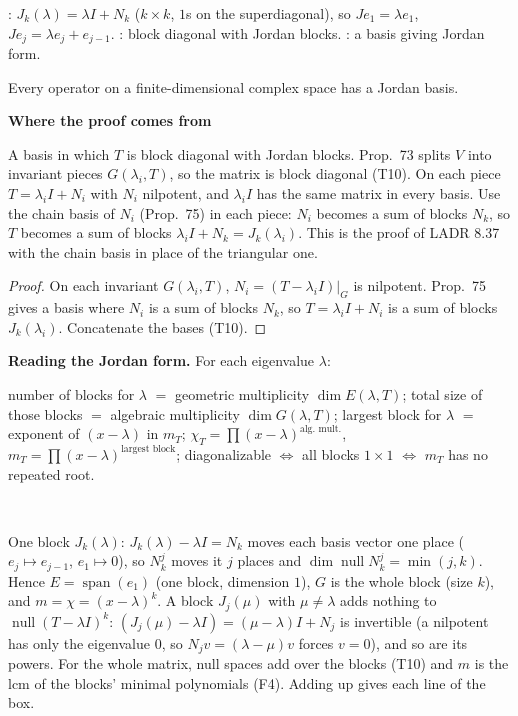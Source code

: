 \documentclass[10pt]{scrartcl}
\DeclareMathOperator{\nul}{null}
\DeclareMathOperator{\spn}{span}
\newcommand{\why}[1]{\par\vspace{2pt}{\color{OliveGreen!70!black}\textbf{Why.}}\ #1\par}
\newenvironment{motive}{\begin{mdframed}[style=thinkbox]\textbf{\color{OliveGreen!75!black}Where the proof comes from}\begin{description}[leftmargin=0.9em,labelindent=0pt,itemsep=2pt,topsep=2pt,font=\normalfont\bfseries\color{OliveGreen!70!black}]}{\end{description}\end{mdframed}}
\newenvironment{steps}{\begin{enumerate}[label=\arabic*.,leftmargin=1.5em,itemsep=2pt,topsep=2pt]}{\end{enumerate}}
\begin{document}
\begin{definition*}[Def.~40]
  : $J_k(\lambda)=\lambda I+N_k$ ($k\times k$, $1$s on the superdiagonal), so $Je_1=\lambda e_1$, $Je_j=\lambda e_j+e_{j-1}$. : block diagonal with Jordan blocks. : a basis giving Jordan form.
\end{definition*}

\begin{theorem*}
  Every operator on a finite-dimensional complex space has a Jordan basis.
\end{theorem*}
\begin{motive}
  \ii[Want.] A basis in which $T$ is block diagonal with Jordan blocks.
  \ii[Know.] Prop.~73 splits $V$ into invariant pieces $G(\lambda_i,T)$, so the matrix is block diagonal (T10). On each piece $T=\lambda_iI+N_i$ with $N_i$ nilpotent, and $\lambda_iI$ has the same matrix in every basis.
   Use the chain basis of $N_i$ (Prop.~75) in each piece: $N_i$ becomes a sum of blocks $N_k$, so $T$ becomes a sum of blocks $\lambda_iI+N_k=J_k(\lambda_i)$. This is the proof of LADR 8.37 with the chain basis in place of the triangular one.
\end{motive}
\begin{proof}
  On each invariant $G(\lambda_i,T)$, $N_i=(T-\lambda_iI)|_{G}$ is nilpotent. Prop.~75 gives a basis where $N_i$ is a sum of blocks $N_k$, so $T=\lambda_iI+N_i$ is a sum of blocks $J_k(\lambda_i)$. Concatenate the bases (T10).
\end{proof}

\begin{mdframed}[style=mdbluebox]
\textbf{Reading the Jordan form.} For each eigenvalue $\lambda$:
\begin{itemize}
  \ii number of blocks for $\lambda$ $=$ geometric multiplicity $\dim E(\lambda,T)$;
  \ii total size of those blocks $=$ algebraic multiplicity $\dim G(\lambda,T)$;
  \ii largest block for $\lambda$ $=$ exponent of $(x-\lambda)$ in $m_T$;
  \ii $\chi_T=\prod(x-\lambda)^{\text{alg.\ mult.}}$, $m_T=\prod(x-\lambda)^{\text{largest block}}$;
  \ii diagonalizable $\iff$ all blocks $1\times1$ $\iff$ $m_T$ has no repeated root.
\end{itemize}
\why{\begin{steps}
  \ii One block $J_k(\lambda)$: $J_k(\lambda)-\lambda I=N_k$ moves each basis vector one place ($e_j\mapsto e_{j-1}$, $e_1\mapsto0$), so $N_k^j$ moves it $j$ places and $\dim\nul N_k^j=\min(j,k)$. Hence $E=\spn(e_1)$ (one block, dimension $1$), $G$ is the whole block (size $k$), and $m=\chi=(x-\lambda)^k$.
  \ii A block $J_j(\mu)$ with $\mu\ne\lambda$ adds nothing to $\nul(T-\lambda I)^k$: $(J_j(\mu)-\lambda I)=(\mu-\lambda)I+N_j$ is invertible (a nilpotent has only the eigenvalue $0$, so $N_jv=(\lambda-\mu)v$ forces $v=0$), and so are its powers.
  \ii For the whole matrix, null spaces add over the blocks (T10) and $m$ is the lcm of the blocks' minimal polynomials (F4). Adding up gives each line of the box.
\end{steps}}
\end{mdframed}
\end{document}
